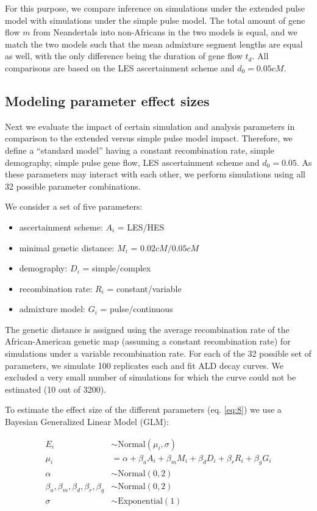 \documentclass[]{article}
\begin{document}
For this purpose, we compare inference on simulations under the extended pulse model with simulations under the simple pulse model. 
The total amount of gene flow $m$ from Neandertals into non-Africans
in the two models is equal, and we match the two models such that the mean admixture segment lengths are equal as well, with the only difference being the duration of gene flow $t_d$. All comparisons are based on the LES ascertainment scheme and $d_0 =  0.05 cM$. 


\subsection{Modeling parameter effect sizes}\label{modeling prameter effect sizes}

Next we evaluate the impact of certain simulation and analysis parameters in comparison to the extended versus simple pulse model impact. Therefore, we define a ``standard model'' having a constant recombination rate, simple demography, simple pulse gene flow, LES ascertainment scheme and $d_0 = 0.05$. As these parameters may interact with each other, we perform simulations using all 32 possible parameter combinations.


We consider a set of five parameters:
\begin{itemize} 
    \item ascertainment scheme: $A_i$ = LES/HES
    \item minimal genetic distance: $M_i$ = $0.02 cM/ 0.05 cM$
    \item demography: $D_i$ = simple/complex
    \item recombination rate: $R_i$ = constant/variable
    \item admixture model: $G_i$ = pulse/continuous
\end{itemize}

The genetic distance is assigned using the average recombination rate of the African-American genetic map (assuming a constant recombination rate) for simulations under a variable recombination rate.
For each of the 32 possible set of parameters, we simulate 100 replicates each and fit ALD decay curves. We excluded a very small number of simulations for which the curve could not be estimated (10 out of 3200). 



To estimate the effect size of the different parameters (eq.
\ref{eq:8}) we use a Bayesian Generalized Linear Model (GLM):

\begin{equation}\label{eq:8}
\begin{split}
E_i &\sim \text{Normal}(\mu_i,\sigma) \\
\mu_i &= \alpha + \beta_aA_i + \beta_mM_i + \beta_dD_i + \beta_rR_i + \beta_gG_i \\
\alpha &\sim \text{Normal}(0,2) \\
\beta_a,\beta_m,\beta_d,\beta_r,\beta_g &\sim \text{Normal}(0,2) \\
\sigma &\sim \text{Exponential}(1)
\end{split}
\end{equation}
\end{document}
